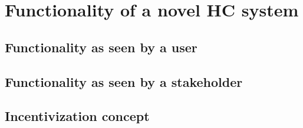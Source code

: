 \section{Functionality of a novel HC system}
  \subsection{Functionality as seen by a user}
  \subsection{Functionality as seen by a stakeholder}
  \subsection{Incentivization concept}
